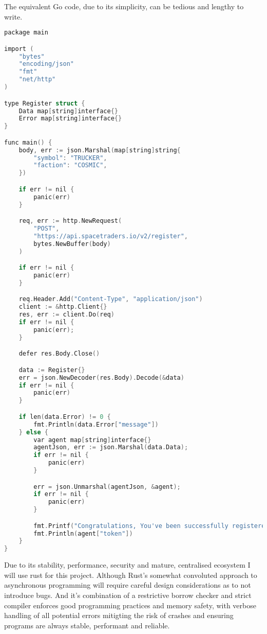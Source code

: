 The equivalent Go code, due to its simplicity, can be tedious and lengthy to write. 

\begin{lstlisting}[language=C]
package main

import (
	"bytes"
	"encoding/json"
	"fmt"
	"net/http"
)

type Register struct {
    Data map[string]interface{}
    Error map[string]interface{}
}

func main() {
    body, err := json.Marshal(map[string]string{
        "symbol": "TRUCKER",
	    "faction": "COSMIC",
    }) 

    if err != nil {
        panic(err)
    }

    req, err := http.NewRequest(
        "POST",       
        "https://api.spacetraders.io/v2/register", 
        bytes.NewBuffer(body)
    )

    if err != nil {
        panic(err)
    }

    req.Header.Add("Content-Type", "application/json")
    client := &http.Client{}
    res, err := client.Do(req)
    if err != nil {
        panic(err);
    }

    defer res.Body.Close()

    data := Register{}
    err = json.NewDecoder(res.Body).Decode(&data)
    if err != nil {
        panic(err)
    }

    if len(data.Error) != 0 {
        fmt.Println(data.Error["message"])
    } else {
        var agent map[string]interface{}
        agentJson, err := json.Marshal(data.Data);
        if err != nil {
            panic(err)
        }

        err = json.Unmarshal(agentJson, &agent);
        if err != nil {
            panic(err)
        }

        fmt.Printf("Congratulations, You've been successfully registered. Please note your access token:\n")
        fmt.Println(agent["token"])
    }
}
\end{lstlisting}

Due to its stability, performance, security and mature, centralised ecosystem I will use rust for this project. Although Rust’s somewhat convoluted approach to asynchronous programming will require careful design considerations as to not introduce bugs. And it's combination of a restrictive borrow checker and strict compiler enforces good programming practices and memory safety, with verbose handling of all potential errors mitigting the risk of crashes and ensuring programs are always stable, performant and reliable. 

